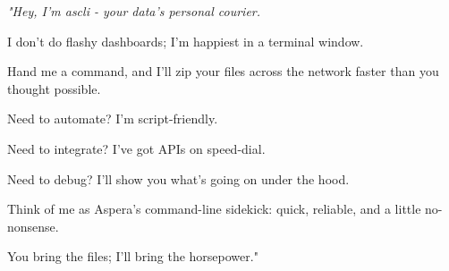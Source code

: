 \thispagestyle{empty}
\vspace*{\fill}
\begin{center}


\vspace{4cm}
\large
\itshape
"Hey, I'm ascli - your data's personal courier.

I don't do flashy dashboards; I'm happiest in a terminal window.

Hand me a command, and I'll zip your files across the network faster than you thought possible.

Need to automate? I'm script-friendly.

Need to integrate? I've got APIs on speed-dial.

Need to debug? I'll show you what's going on under the hood.

Think of me as Aspera's command-line sidekick: quick, reliable, and a little no-nonsense.

You bring the files; I'll bring the horsepower."
\normalsize
\end{center}
\vspace*{4cm}
\newpage
